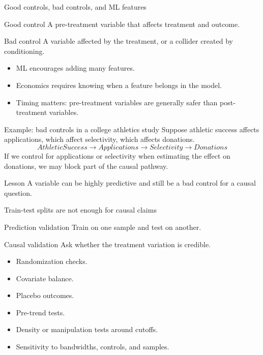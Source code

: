 \documentclass[aspectratio=169,11pt]{beamer}
\begin{document}
\begin{frame}{Good controls, bad controls, and ML features}
\begin{block}{Good control}
A pre-treatment variable that affects treatment and outcome.
\end{block}
\begin{alertblock}{Bad control}
A variable affected by the treatment, or a collider created by conditioning.
\end{alertblock}
\begin{itemize}
  \item ML encourages adding many features.
  \item Economics requires knowing when a feature belongs in the model.
  \item Timing matters: pre-treatment variables are generally safer than post-treatment variables.
\end{itemize}
\end{frame}

\begin{frame}{Example: bad controls in a college athletics study}
Suppose athletic success affects applications, which affect selectivity, which affects donations.
\[
AthleticSuccess \rightarrow Applications \rightarrow Selectivity \rightarrow Donations
\]
If we control for applications or selectivity when estimating the effect on donations, we may block part of the causal pathway.
\begin{alertblock}{Lesson}
A variable can be highly predictive and still be a bad control for a causal question.
\end{alertblock}
\end{frame}

\begin{frame}{Train-test splits are not enough for causal claims}
\begin{block}{Prediction validation}
Train on one sample and test on another.
\end{block}
\begin{alertblock}{Causal validation}
Ask whether the treatment variation is credible.
\end{alertblock}
\begin{itemize}
  \item Randomization checks.
  \item Covariate balance.
  \item Placebo outcomes.
  \item Pre-trend tests.
  \item Density or manipulation tests around cutoffs.
  \item Sensitivity to bandwidths, controls, and samples.
\end{itemize}
\end{frame}
\end{document}
